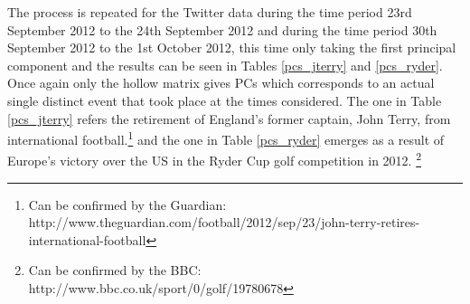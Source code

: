 \documentclass[11pt,a4paper]{article}
\begin{document}
The process is repeated for the Twitter data during the time period 23rd September 2012 to the 24th September 2012 and during the time period 30th September 2012 to the 1st October 2012, this time only taking the first principal component and the results can be seen in Tables \ref{pcs_jterry} and \ref{pcs_ryder}. Once again only the hollow matrix gives PCs which corresponds to an actual single distinct event that took place at the times considered. The one in Table \ref{pcs_jterry} refers the retirement of England's former captain, John Terry, from international football.\footnote{Can be confirmed by the Guardian: http://www.theguardian.com/football/2012/sep/23/john-terry-retires-international-football} and the one in Table \ref{pcs_ryder} emerges as a result of Europe's victory over the US in the Ryder Cup golf competition in 2012. \footnote{Can be confirmed by the BBC: http://www.bbc.co.uk/sport/0/golf/19780678}

\end{document}
